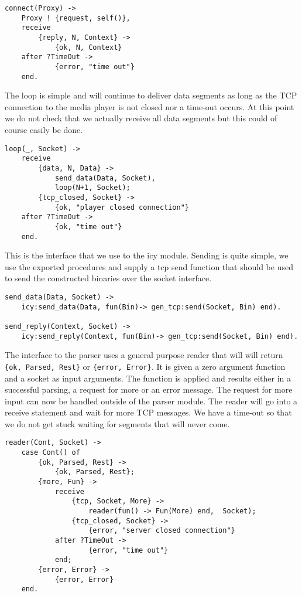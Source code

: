 \documentclass[a4paper,11pt]{article}
\begin{document}
\begin{verbatim}
connect(Proxy) ->
    Proxy ! {request, self()},
    receive 
        {reply, N, Context} ->
            {ok, N, Context}
    after ?TimeOut ->
            {error, "time out"}
    end.
\end{verbatim}

The loop is simple and will continue to deliver data segments as long
as the TCP connection to the media player is not closed nor a time-out
occurs. At this point we do not check that we actually receive all
data segments but this could of course easily be done. 

\begin{verbatim}
loop(_, Socket) ->
    receive
        {data, N, Data} ->
            send_data(Data, Socket),
            loop(N+1, Socket);
        {tcp_closed, Socket} ->
            {ok, "player closed connection"}
    after ?TimeOut ->
            {ok, "time out"}
    end.
\end{verbatim}

This is the interface that we use to the icy module. Sending is quite
simple, we use the exported procedures and supply a tcp send function
that should be used to send the constructed binaries over the socket
interface.

\begin{verbatim}
send_data(Data, Socket) ->
    icy:send_data(Data, fun(Bin)-> gen_tcp:send(Socket, Bin) end).

send_reply(Context, Socket) ->
    icy:send_reply(Context, fun(Bin)-> gen_tcp:send(Socket, Bin) end).
\end{verbatim}

The interface to the parser uses a general purpose reader that will
will return {\tt \{ok, Parsed, Rest\}} or {\tt \{error, Error\}}. It
is given a zero argument function and a socket as input arguments. The
function is applied and results either in a successful parsing, a
request for more or an error message. The request for more input can
now be handled outside of the parser module. The reader will go into a
receive statement and wait for more TCP messages. We have a time-out
so that we do not get stuck waiting for segments that will never come.

\begin{verbatim}
reader(Cont, Socket) ->
    case Cont() of
        {ok, Parsed, Rest} ->
            {ok, Parsed, Rest};
        {more, Fun} ->
            receive
                {tcp, Socket, More} ->
                    reader(fun() -> Fun(More) end,  Socket);
                {tcp_closed, Socket} ->
                    {error, "server closed connection"}
            after ?TimeOut ->
                    {error, "time out"}
            end;
        {error, Error} ->
            {error, Error}
    end.
\end{verbatim}
\end{document}
